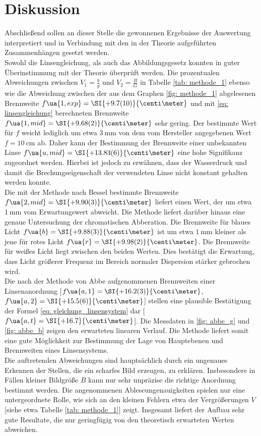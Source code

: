 \section{Diskussion}
Abschließend sollen an dieser Stelle die gewonnenen Ergebnisse der Auswertung interpretiert und
in Verbindung mit den in der Theorie aufgeführten Zusammenhängen gesetzt werden.\\
Sowohl die Linsengleichung, als auch das Abbildungsgesetz konnten in guter Überinstimmung
mit der Theorie überprüft werden. Die prozentualen Abweichungen zwischen $V_1 = \frac{b}{g}$ und $V_2 = \frac{B}{G}$ %
in Tabelle \ref{tab: methode_1} ebenso wie die Abweichung zwischen der aus dem Graphen \ref{fig: methode_1} abgelesenen Brennweite $f\ua{1, exp} = \SI{+9.7(10)}{\centi\meter}$ und mit \eqref{eq: linsengleichung} %
berechneten Brennweite $  f\ua{1, mid} = \SI{+9.68(2)}{\centi\meter}$ sehr gering. Der bestimmte Wert für $f$ weicht lediglich um etwa $\SI{3}{\milli\meter}$ von dem vom Hersteller
angegebenen Wert $f = \SI{10}{\centi\meter}$ ab. Daher kann der Bestimmung der Brennweite einer unbekannten Linse $  f\ua{u, mid} = \SI{+13.83(6)}{\centi\meter}$
eine hohe Signifikanz zugeordnet werden. Hierbei ist jedoch zu erwähnen, dass der Wasserdruck und damit die Brechungseigenschaft der %
verwendeten Linse nicht konstant gehalten werden konnte. \\ %
Die mit der Methode nach Bessel bestimmte Brennweite $f\ua{2, mid} = \SI{+9.90(3)}{\centi\meter}$ liefert einen Wert, der um etwa $\SI{1}{\milli\meter}$ vom Erwartungswert abweicht. Die Methode
liefert darüber hinaus eine genaue Untersuchung der chromatischen Abberation. Die Brennweite für blaues Licht $f\ua{b} = \SI{+9.88(3)}{\centi\meter}$ ist um etwa
$\SI{1}{\milli\meter}$ kleiner als jene für rotes Licht $f\ua{r} = \SI{+9.98(2)}{\centi\meter}$. Die Brennweite für weißes Licht liegt
zwischen den beiden Werten. Dies bestätigt die Erwartung, dass Licht größerer Frequenz im Bereich %
normaler Dispersion stärker gebrochen wird.\\
Die nach der Methode von Abbe aufgenommenen Brennweiten einer Linsenanordnung [$f\ua{a, 1} = \SI{+16.2(3)}{\centi\meter}$, $f\ua{a, 2} = \SI{+15.5(6)}{\centi\meter}$] stellen eine plausible Bestätigung der Formel
\eqref{eq: gleichung_linsensystem} dar [$f\ua{a, t} = \SI{+16.7}{\centi\meter}$]. Die Messdaten in \ref{fig: abbe_g} und \ref{fig: abbe_b} zeigen den erwarteten linearen Verlauf.
Die Methode liefert somit eine gute Möglichkeit zur Bestimmung der Lage von Hauptebenen und Brennweiten eines Linsensystems.\\
Die auftretenden Abweichungen sind hauptsächlich durch ein ungenaues Erkennen der Stellen, die ein scharfes Bild erzeugen, zu erklären.
Insbesondere in Fällen kleiner Bildgröße $B$ kann nur sehr unpräzise die richtige Anordnung bestimmt werden. Die angenommenen Ableseungenauigkeiten
spielen nur eine untergeordnete Rolle, wie sich an den kleinen Fehlern etwa der Vergrößerungen $V$ [siehe etwa Tabelle \ref{tab: methode_1}] zeigt. %
Insgesamt liefert der Aufbau sehr gute Resultate, die nur geringfügig von den theoretisch erwarteten Werten abweichen. %
